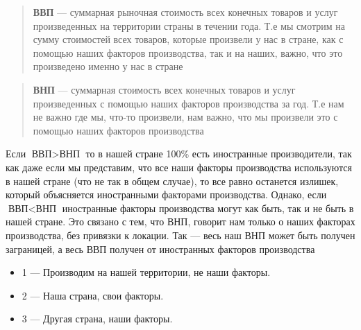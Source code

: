 \documentclass{article}
\begin{document}
    \begin{quote}
        \textbf{ВВП} --- суммарная рыночная стоимость всех конечных товаров
        и услуг произведенных на территории страны в течении года. Т.е
        мы смотрим на сумму стоимостей всех товаров, которые произвели у нас в стране, как с помощью
        наших факторов производства, так и на наших, важно, что это произведено именно у нас в стране
    \end{quote}

    \begin{quote}
        \textbf{ВНП} --- суммарная стоимость всех конечных товаров и услуг
        произведенных с помощью наших факторов производства за год. Т.е нам не важно
        где мы, что-то произвели, нам важно, что мы произвели это с помощью наших факторов
        производства
    \end{quote}

    Если $\text{ВВП} > \text{ВНП}$ то в нашей стране 100\% есть иностранные производители, так как даже если
    мы представим, что все наши факторы производства используются в нашей стране (что не так в общем случае),
    то все равно останется излишек, который объясняется иностранными факторами производства. Однако, если
    $\text{ВВП} < \text{ВНП}$ иностранные факторы производства могут как быть, так и не быть в нашей стране. Это
    связано с тем, что ВНП, говорит нам только о наших факторах производства, без привязки к локации. Так --- весь
    наш ВНП может быть получен заграницей, а весь ВВП получен от иностранных факторов производства

    \begin{center}
    \end{center}

    \begin{itemize}
        \item 1 --- Производим на нашей территории, не наши факторы.
        \item 2 --- Наша страна, свои факторы.
        \item 3 --- Другая страна, наши факторы.
    \end{itemize}
\end{document}
